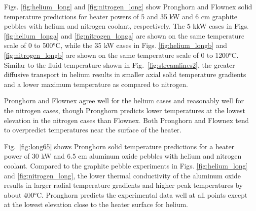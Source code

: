 Figs. \ref{fig:helium_long} and \ref{fig:nitrogen_long} show Pronghorn and Flownex solid temperature predictions for heater powers of 5 and 35 \si{\kilo\watt} and 6 \si{\centi\meter} graphite pebbles with helium and nitrogen coolant, respectively. The 5 k\si{\kilo\watt} cases in Figs. \ref{fig:helium_longa} and \ref{fig:nitrogen_longa} are shown on the same temperature scale of 0 to 500\si{\celsius}, while the 35 \si{\kilo\watt} cases in Figs. \ref{fig:helium_longb} and \ref{fig:nitrogen_longb} are shown on the same temperature scale of 0 to 1200\si{\celsius}. Similar to the fluid temperature shown in Fig.\ \ref{fig:streamlines2}, the greater diffusive transport in helium results in smaller axial solid temperature gradients and a lower maximum temperature as compared to nitrogen. 

Pronghorn and Flownex agree well for the helium cases and reasonably well for the nitrogen cases, though Pronghorn predicts lower temperatures at the lowest elevation in the nitrogen cases than Flownex. Both Pronghorn and Flownex tend to overpredict temperatures near the surface of the heater.

Fig.\ \ref{fig:long65} shows Pronghorn solid temperature predictions for a heater power of 30 \si{\kilo\watt} and 6.5 \si{\centi\meter} aluminum oxide pebbles with helium and nitrogen coolant. Compared to the graphite pebble experiments in Figs. \ref{fig:helium_long} and \ref{fig:nitrogen_long}, the lower thermal conductivity of the aluminum oxide results in larger radial temperature gradients and higher peak temperatures by about 400\si{\celsius}. Pronghorn predicts the experimental data well at all points except at the lowest elevation close to the heater surface for helium.

